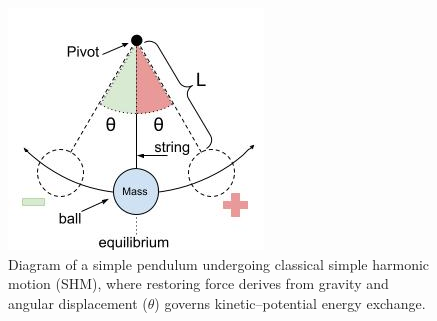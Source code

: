 \documentclass[10pt,aps,pre,onecolumn,superscriptaddress,notitlepage]{revtex4-2}
\begin{document}
\begin{figure}[h]
  \centering
  \begin{minipage}[c]{0.54\linewidth}
    \includegraphics[width=\linewidth]{figures/pendulum.jpg}
  \end{minipage}%
  \hfill
  \begin{minipage}[c]{0.7\linewidth}
    \caption{Diagram of a simple pendulum undergoing classical simple harmonic motion (SHM), where restoring force derives from gravity and angular displacement ($\theta$) governs kinetic–potential energy exchange.}
    \label{fig:pendulum}
  \end{minipage}

\vspace{3cm}


\end{figure}
\end{document}
